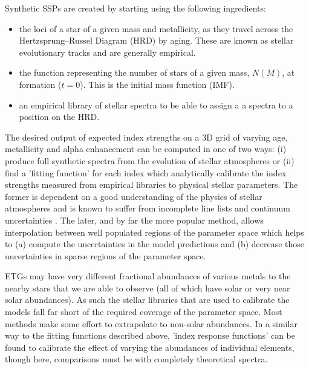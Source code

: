 {{		Synthetic SSPs are created by starting using the following ingredients:
		\begin{itemize}
			\item the loci of a star of a given mass and metallicity, as they travel across the Hertzsprung--Russel Diagram (HRD) by aging. These are known as stellar evolutionary tracks and are generally empirical.
			\item  the function representing the number of stars of a given mass, $N(M)$, at formation ($t = 0$). This is the initial mass function (IMF).
			\item an empirical library of stellar spectra to be able to assign a a spectra to a position on the HRD. 
		\end{itemize}
		The desired output of expected index strengths on a 3D grid of varying age, metallicity and alpha enhancement can be computed in one of two ways: (i) produce full synthetic spectra from the evolution of stellar atmospheres or (ii) find a 'fitting function' for each index which analytically calibrate the index strengths measured from empirical libraries to physical stellar parameters. The former is dependent on a good understanding of the physics of stellar atmospheres and is known to suffer from incomplete line lists and continuum uncertainties \citep{Thomas2004}. The later, and by far the more popular method, allows interpolation between well populated regions of the parameter space which helps to (a) compute the uncertainties in the model predictions and (b) decrease those uncertainties in sparse regions of the parameter space. 

		ETGs may have very different fractional abundances of various metals to the nearby stars that we are able to observe (all of which have solar or very near solar abundances). As such the stellar libraries that are used to calibrate the models fall far short of the required coverage of the parameter space. Most methods make some effort to extrapolate to non-solar abundances. In a similar way to the fitting functions described above, 'index response functions' can be found to calibrate the effect of varying the abundances of individual elements, though here, comparisons must be with completely theoretical spectra.

}}
